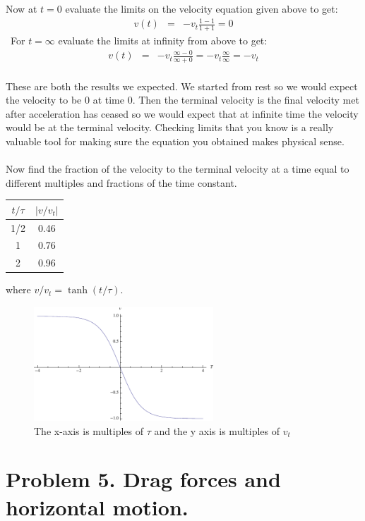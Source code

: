 \documentclass[11pt]{amsart}
\begin{document}
Now at $t=0$ evaluate the limits on the velocity equation given above to get: \\ 
\begin{eqnarray*}
v(t) &=&-v_{t}\frac{1-1}{1+1} = 0 
\end{eqnarray*} \
For $t=\infty$ evaluate the limits at infinity from above to get: \\ 
\begin{eqnarray*}
v(t) &=& -v_{t}\frac{\infty - 0}{\infty + 0} = -v_{t}\frac{\infty}{\infty} = -v_{t} 
\end{eqnarray*} \\
These are both the results we expected. We started from rest so we would expect the velocity to be 0 at time 0. Then the terminal velocity is the final velocity met after acceleration has ceased so we would expect that at infinite time the velocity would be at the terminal velocity. Checking limits that you know is a really valuable tool for making sure the equation you obtained makes physical sense. \\ \\
Now find the fraction of the velocity to the terminal velocity at a time equal to different multiples and fractions of the time constant. 
\begin{center}
\begin{tabular}{c | c}
$t / \tau$ & $|v / v_t|$ 
\\
\hline
1/2 & 0.46
\\
1 & 0.76
\\
2 & 0.96
\end{tabular}
\end{center}
where $v / v_t = \tanh{(t / \tau)}$.
\begin{figure}[htb]
\includegraphics[width=0.6\textwidth]{tanh.pdf}
\caption{The x-axis is multiples of $\tau$ and the y axis is multiples of $v_{t}$}
\label{tanh}
\end{figure}

\section{Problem 5. Drag forces and horizontal motion.}
\end{document}
